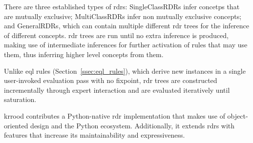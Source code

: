 \documentclass[a4paper,fleqn]{cas-sc}
\begin{document}
There are three established types of \ac{rdr}s: SingleClassRDRs infer concetps that are mutually exclusive; MultiClassRDRs infer non mutually exclusive concepts; and GeneralRDRs, which can contain multiple different \ac{rdr} trees for the inference of different concepts. \ac{rdr} trees are run until no extra inference is produced, making use of intermediate inferences for further activation of rules that may use them, thus inferring higher level concepts from them.

Unlike \ac{eql} rules (Section~\ref{ssec:eql_rules}), which derive new
instances in a single user-invoked evaluation pass with no fixpoint, \ac{rdr}
trees are constructed incrementally through expert interaction and are
evaluated iteratively until saturation.

\ac{krrood} contributes a Python-native \ac{rdr} implementation that makes use of object-oriented design and the Python ecosystem. Additionally, it extends \acp{rdr} with features that increase its maintainability and expressiveness.
\end{document}
